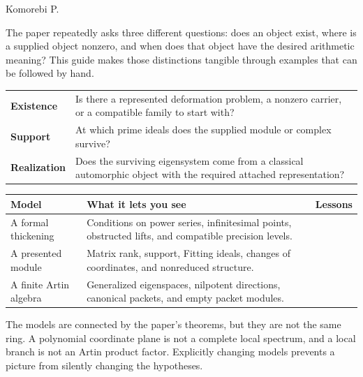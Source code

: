{\sffamily\small Komorebi P.}\par
The paper repeatedly asks three different questions: does an object exist, where is a supplied object nonzero, and when does that object have the desired arithmetic meaning? This guide makes those distinctions tangible through examples that can be followed by hand.

\begin{insight}
\begin{tabularx}{\linewidth}{@{}p{.18\linewidth}Y@{}}
\textbf{Existence} & Is there a represented deformation problem, a nonzero carrier, or a compatible family to start with?\\[3pt]
\textbf{Support} & At which prime ideals does the supplied module or complex survive?\\[3pt]
\textbf{Realization} & Does the surviving eigensystem come from a classical automorphic object with the required attached representation?
\end{tabularx}
\end{insight}

\begin{tabularx}{\linewidth}{@{}p{.20\linewidth}Y>{\raggedright\arraybackslash}p{.15\linewidth}@{}}\toprule
\textbf{Model} & \textbf{What it lets you see} & \textbf{Lessons}\\\midrule
A formal thickening & Conditions on power series, infinitesimal points, obstructed lifts, and compatible precision levels. & \\
A presented module & Matrix rank, support, Fitting ideals, changes of coordinates, and nonreduced structure. & \\
A finite Artin algebra & Generalized eigenspaces, nilpotent directions, canonical packets, and empty packet modules. & \\\bottomrule
\end{tabularx}

The models are connected by the paper's theorems, but they are not the same ring. A polynomial coordinate plane is not a complete local spectrum, and a local branch is not an Artin product factor. Explicitly changing models prevents a picture from silently changing the hypotheses.

